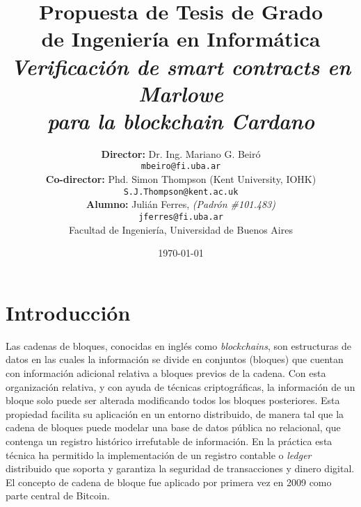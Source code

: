 \documentclass[12pt]{book}
\begin{document}
\begin{titlepage}

\title{     \textbf{Propuesta de Tesis de Grado \\ de Ingeniería en Informática}\\[2.5ex]
\textit{Verificación de smart contracts en Marlowe\\ para la blockchain Cardano}}

\author{
             \textbf{Director:} Dr. Ing. Mariano G. Beiró \\
         \texttt{mbeiro@fi.uba.ar}\\[2.5ex]
             \textbf{Co-director:} Phd. Simon Thompson (Kent University, IOHK) \\
         \texttt{S.J.Thompson@kent.ac.uk}
             \\[2.5ex]
             \textbf{Alumno:} Julián Ferres, \textit{(Padrón \#101.483)}                                \\
                    \texttt{ jferres@fi.uba.ar }                                    \\[2.5ex]
            \normalsize{Facultad de Ingeniería, Universidad de Buenos Aires}        \\
       }
\date{\today}

\end{titlepage}

\maketitle
\thispagestyle{empty}

\maketitle

{
  \hypersetup{linkcolor=black}
  \tableofcontents
}


\section{Introducción}
Las cadenas de bloques, conocidas en inglés como \textit{blockchains}, son estructuras de datos en las cuales la información se divide en conjuntos (bloques) que cuentan con información adicional relativa a bloques previos de la cadena. Con esta organización relativa, y con ayuda de técnicas criptográficas, la información de un bloque solo puede ser alterada modificando todos los bloques posteriores. Esta propiedad facilita su aplicación en un entorno distribuido, de manera tal que la cadena de bloques puede modelar una base de datos pública no relacional, que contenga un registro histórico irrefutable de información.
En la práctica esta técnica ha permitido la implementación de un registro contable o \textit{ledger} distribuido que soporta y garantiza la seguridad de transacciones y dinero digital. El concepto de cadena de bloque fue aplicado por primera vez en 2009 como parte central de Bitcoin.
\end{document}
